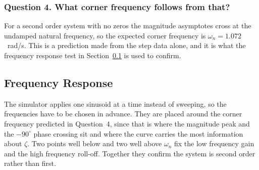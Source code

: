 \subsubsection*{Question 4. What corner frequency follows from that?}

For a second order system with no zeros the magnitude asymptotes cross at the undamped
natural frequency, so the expected corner frequency is $\omega_n = 1.072$~rad/s. This is
a prediction made from the step data alone, and it is what the frequency response test in
Section~\ref{sec:freq} is used to confirm.

\subsection{Frequency Response}\label{sec:freq}

The simulator applies one sinusoid at a time instead of sweeping, so the frequencies have to be
chosen in advance. They are placed around the corner frequency predicted in Question~4, since
that is where the magnitude peak and the $-90^\circ$ phase crossing sit and where the curve
carries the most information about $\zeta$. Two points well below and two well above $\omega_n$
fix the low frequency gain and the high frequency roll-off. Together they confirm the system is
second order rather than first.


